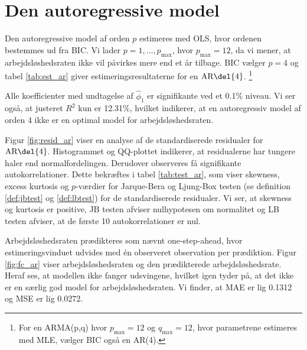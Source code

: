 \section{Den autoregressive model}
Den autoregressive model af orden \(p\) estimeres med OLS, hvor ordenen bestemmes ud fra BIC.
Vi lader $p = 1, \ldots, p_{\max}$, hvor \(p_\text{max}=12\), da vi mener, at arbejdsløshedsraten ikke vil påvirkes mere end et år tilbage.
BIC vælger \(p=4\) og tabel \ref{tab:est_ar} giver estimeringsresultaterne for en \(\text{AR} \del{4}\). \footnote{For en ARMA(p,q) hvor $p_{\max} = 12$ og $q_{\max} = 12$, hvor parametrene estimeres med MLE, vælger BIC også en AR(4).}
%


Alle koefficienter med undtagelse af $\widehat\phi_1$ er signifikante ved et 0.1\% niveau. 
Vi ser også, at justeret $R^2$ kun er 12.31\%, hvilket indikerer, at en autoregressiv model af orden 4 ikke er en optimal model for arbejdsløshedsraten. 



Figur \ref{fig:resid_ar} viser en analyse af de standardiserede residualer for \(\text{AR} \del{4}\). 
Histogrammet og QQ-plottet indikerer, at residualerne har tungere haler end normalfordelingen. 
Derudover observeres få signifikante autokorrelationer.
Dette bekræftes i tabel \ref{tab:test_ar}, som viser skewness, excess kurtosis og \(p\)-værdier for Jarque-Bera og Ljung-Box testen (se definition \ref{def:jbtest} og \ref{def:lbtest}) for de standardiserede residualer. 
Vi ser, at skewness og kurtosis er positive, JB testen afviser nulhypotesen om normalitet og LB testen afviser, at de første 10 autokorrelationer er nul.

Arbejdsløshedsraten prædikteres som nævnt one-step-ahead, hvor estimeringsvinduet udvides med én observeret observation per prædiktion.
Figur \ref{fig:fc_ar} viser arbejdsløshedsraten og den prædikterede arbejdsløshedsrate. 
Heraf ses, at modellen ikke fanger udsvingene, hvilket igen tyder på, at det ikke er en særlig god model for arbejdsløshedsraten. 
Vi finder, at MAE er lig 0.1312 og MSE er lig 0.0272.
%

\newpage
